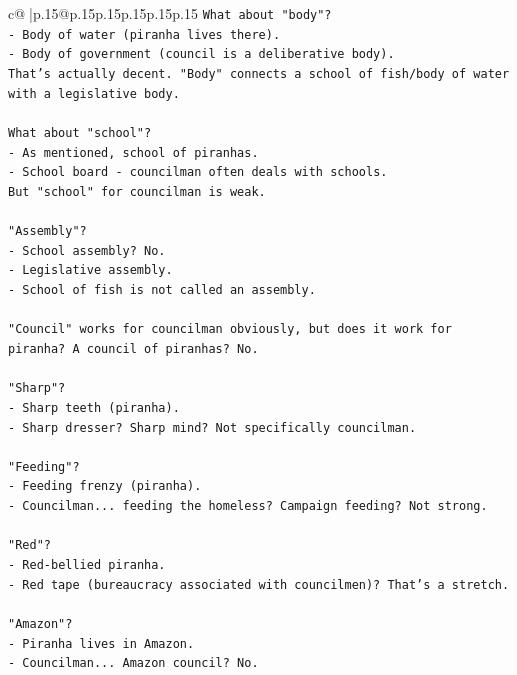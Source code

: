 \documentclass{article}
\begin{document}
{\begin{supertabular}{c@{$\;$}|p{.15\linewidth}@{}p{.15\linewidth}p{.15\linewidth}p{.15\linewidth}p{.15\linewidth}p{.15\linewidth}}
{{{\texttt{What about "body"?} \\
\texttt{{-} Body of water (piranha lives there).} \\
\texttt{{-} Body of government (council is a deliberative body).} \\
\texttt{That's actually decent. "Body" connects a school of fish/body of water with a legislative body.} \\
\\ 
\texttt{What about "school"?} \\
\texttt{{-} As mentioned, school of piranhas.} \\
\texttt{{-} School board {-} councilman often deals with schools.} \\
\texttt{But "school" for councilman is weak.} \\
\\ 
\texttt{"Assembly"?} \\
\texttt{{-} School assembly? No.} \\
\texttt{{-} Legislative assembly.} \\
\texttt{{-} School of fish is not called an assembly.} \\
\\ 
\texttt{"Council" works for councilman obviously, but does it work for piranha? A council of piranhas? No.} \\
\\ 
\texttt{"Sharp"?} \\
\texttt{{-} Sharp teeth (piranha).} \\
\texttt{{-} Sharp dresser? Sharp mind? Not specifically councilman.} \\
\\ 
\texttt{"Feeding"?} \\
\texttt{{-} Feeding frenzy (piranha).} \\
\texttt{{-} Councilman... feeding the homeless? Campaign feeding? Not strong.} \\
\\ 
\texttt{"Red"?} \\
\texttt{{-} Red{-}bellied piranha.} \\
\texttt{{-} Red tape (bureaucracy associated with councilmen)? That's a stretch.} \\
\\ 
\texttt{"Amazon"?} \\
\texttt{{-} Piranha lives in Amazon.} \\
\texttt{{-} Councilman... Amazon council? No.} \\
\\ 
}}}
\end{supertabular}}
\end{document}
